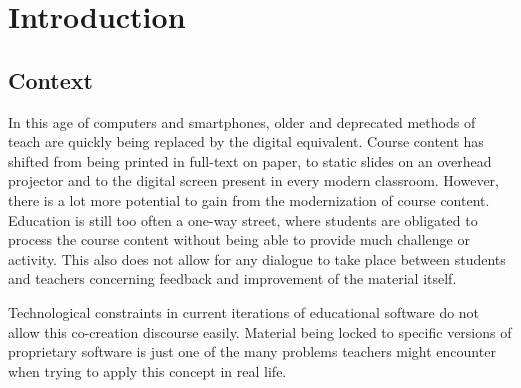 
\chapter*{Introduction}
\label{ch:introduction}



\section{Context}
\label{sec:context}

In this age of computers and smartphones, older and deprecated methods of teach are quickly being replaced by the digital equivalent. Course content has shifted from being printed in full-text on paper, to static slides on an overhead projector and to the digital screen present in every modern classroom. However, there is a lot more potential to gain from the modernization of course content. Education is still too often a one-way street, where students are obligated to process the course content without being able to provide much challenge or activity. This also does not allow for any dialogue to take place between students and teachers concerning feedback and improvement of the material itself.

Technological constraints in current iterations of educational software do not allow this co-creation discourse easily. Material being locked to specific versions of proprietary software is just one of the many problems teachers might encounter when trying to apply this concept in real life.

